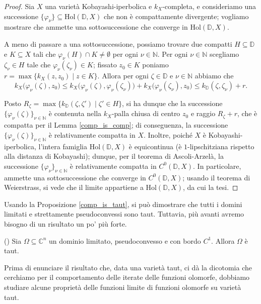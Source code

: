 \begin{proof}
    Sia $X$ una varietà Kobayashi-iperbolica e $k_X$-completa, e consideriamo una successione $\{\varphi_\nu\}\subseteq\text{Hol}(\mathbb{D},X)$ che non è compattamente divergente; vogliamo mostrare che ammette una sottosuccessione che converge in $\text{Hol}(\mathbb{D},X)$.

    A meno di passare a una sottosuccessione, possiamo trovare due compatti $H\subseteq\mathbb{D}$ e $K\subseteq X$ tali che $\varphi_\nu(H)\cap K\not=\emptyset$ per ogni $\nu\in\mathbb{N}$. Per ogni $\nu\in\mathbb{{N}}$ scegliamo $\zeta_\nu\in H$ tale che $\varphi_\nu(\zeta_\nu)\in K$; fissato $z_0\in K$ poniamo $r=\max\{k_X(z,z_0)\mid z\in K\}$. Allora per ogni $\zeta\in\mathbb{D}$ e $\nu\in\mathbb{N}$ abbiamo che
    $$k_X\big(\varphi_\nu(\zeta),z_0\big) \le k_X\big(\varphi_\nu(\zeta),\varphi_\nu(\zeta_\nu)\big)+k_X\big(\varphi_\nu(\zeta_\nu),z_0\big) \le k_{\mathbb{D}} (\zeta,\zeta_\nu)+r.$$

    Posto $R_\zeta=\max\{k_{\mathbb{D}}(\zeta,\zeta')\mid \zeta'\in H\}$, si ha dunque che la successione $\{\varphi_\nu(\zeta)\}_{\nu\in\mathbb{N}}$ è contenuta nella $k_X$-palla chiusa di centro $z_0$ e raggio $R_\zeta+r$, che è compatta per il Lemma \ref{comp_is_comp}; di conseguenza, la successione $\{\varphi_\nu(\zeta)\}_{\nu\in\mathbb{N}}$ è relativamente compatta in $X$. Inoltre, poiché $X$ è Kobayashi-iperbolica, l'intera famiglia $\text{Hol}(\mathbb{D},X)$ è equicontinua (è $1$-lipschitziana rispetto alla distanza di Kobayashi); dunque, per il teorema di Ascoli-Arzelà, la successione $\{\varphi_\nu\}_{\nu\in\mathbb{N}}$ è relativamente compatta in $C^0(\mathbb{D},X)$. In particolare, ammette una sottosuccessione che converge in $C^0(\mathbb{D},X)$; usando il teorema di Weierstrass, si vede che il limite appartiene a $\text{Hol}(\mathbb{D},X)$, da cui la tesi.
\end{proof}

Usando la Proposizione \ref{comp_is_taut}, si può dimostrare che tutti i domini limitati e strettamente pseudoconvessi sono taut. Tuttavia, più avanti avremo bisogno di un risultato un po' più forte.

\begin{prop} \label{psdcvx_is_taut}
    (\cite[Proposition 2]{KR}) Sia $\Omega\subseteq\mathbb{C}^n$ un dominio limitato, pseudoconvesso e con bordo $C^1$. Allora $\Omega$ è taut.
\end{prop}

Prima di enunciare il risultato che, data una varietà taut, ci dà la dicotomia che cerchiamo per il comportamento delle iterate delle funzioni olomorfe, dobbiamo studiare alcune proprietà delle funzioni limite di funzioni olomorfe su varietà taut.

